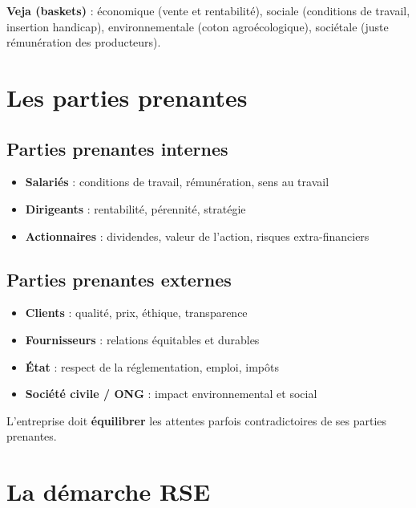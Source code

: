 \documentclass[11pt,a4paper]{article}
\begin{document}
\begin{exbox}
\textbf{Veja (baskets)} : économique (vente et rentabilité), sociale (conditions de travail, insertion handicap), environnementale (coton agroécologique), sociétale (juste rémunération des producteurs).
\end{exbox}

\section*{Les parties prenantes}

\subsection*{Parties prenantes internes}
\begin{itemize}
  \item \textbf{Salariés} : conditions de travail, rémunération, sens au travail
  \item \textbf{Dirigeants} : rentabilité, pérennité, stratégie
  \item \textbf{Actionnaires} : dividendes, valeur de l'action, risques extra-financiers
\end{itemize}

\subsection*{Parties prenantes externes}
\begin{itemize}
  \item \textbf{Clients} : qualité, prix, éthique, transparence
  \item \textbf{Fournisseurs} : relations équitables et durables
  \item \textbf{État} : respect de la réglementation, emploi, impôts
  \item \textbf{Société civile / ONG} : impact environnemental et social
\end{itemize}

\begin{keybox}
L'entreprise doit \textbf{équilibrer} les attentes parfois contradictoires de ses parties prenantes.
\end{keybox}

\section*{La démarche RSE}
\end{document}
